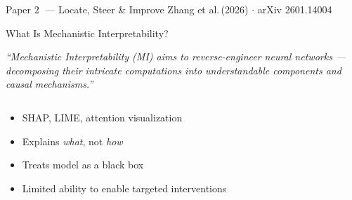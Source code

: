 %
  {Paper \textcircled{2} --- Locate, Steer \& Improve}%
  {Zhang et al.\,(2026) $\cdot$ arXiv 2601.14004}

\begin{frame}{What Is Mechanistic Interpretability?}
  \begin{ucrinfo}
    \small\itshape
    ``Mechanistic Interpretability (MI) aims to reverse-engineer neural networks ---
    decomposing their intricate computations into understandable components
    and causal mechanisms.'' \hfill{}
  \end{ucrinfo}
  \vspace{0.4em}

  \begin{columns}[T]
    \begin{tcolorbox}[enhanced, colback=UCRlgray, colframe=UCRmgray,
        sharp corners, fonttitle=\bfseries\small\color{UCRmgray},
        title=Traditional Interpretability]
      \begin{itemize}\footnotesize\setlength\itemsep{3pt}
        \item[\color{UCRmgray}$\circ$] SHAP, LIME, attention visualization
        \item[\color{UCRmgray}$\circ$] Explains \emph{what}, not \emph{how}
        \item[\color{UCRmgray}$\circ$] Treats model as a black box
        \item[\color{UCRmgray}$\circ$] Limited ability to enable targeted interventions
      \end{itemize}
    \end{tcolorbox}


\end{columns}
\end{frame}
